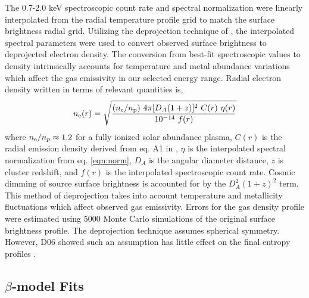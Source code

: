 \documentclass[12pt,preprint]{aastex}
\begin{document}
The 0.7-2.0 keV spectroscopic count rate and spectral normalization
were linearly interpolated from the radial temperature profile grid to
match the surface brightness radial grid. Utilizing the deprojection
technique of \citet{kriss83}, the interpolated spectral parameters
were used to convert observed surface brightness to deprojected
electron density. The conversion from best-fit spectroscopic values to
density intrinsically accounts for temperature and metal abundance
variations which affect the gas emissivity in our selected energy
range. Radial electron density written in terms of relevant quantities
is,
\begin{equation}
n_{\mathrm{e}}(r) = \sqrt{\frac{(n_{\mathrm{e}}/n_{\mathrm{p}})~4 \pi [D_A(1+z)]^2~C(r)~\eta(r)}{10^{-14}~f(r)}}
\end{equation}
where $n_{\mathrm{e}}/n_p \approx 1.2$ for a fully ionized solar abundance
plasma, $C(r)$ is the radial emission density derived from eq. A1 in
\citet{kriss83}, $\eta$ is the interpolated spectral normalization
from eq. \ref{eqn:norm}, $D_A$ is the angular diameter distance, $z$
is cluster redshift, and $f(r)$ is the interpolated spectroscopic
count rate. Cosmic dimming of source surface brightness is accounted
for by the $D_A^2 (1+z)^2$ term. This method of deprojection takes
into account temperature and metallicity fluctuations which affect
observed gas emissivity. Errors for the gas density profile were
estimated using 5000 Monte Carlo simulations of the original surface
brightness profile. The \citet{kriss83} deprojection technique assumes
spherical symmetry. However, D06 showed such an assumption has little
effect on the final entropy profiles \citep[see also][for the low
impact of spherical symmetry assumptions for deriving density
profiles]{2003ApJ...598..190D, 2005MNRAS.359.1481B}.

\subsection{$\beta$-model Fits}
\label{sec:beta}
\end{document}
